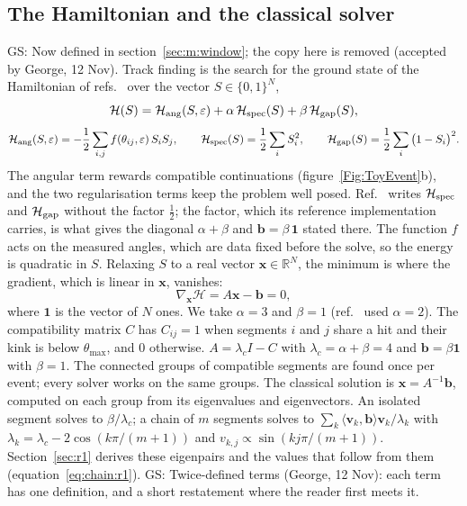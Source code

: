 \documentclass[11pt,a4paper]{article}
\newcommand{\gs}[1]{{\color{orange!85!black} GS: #1 }}
\newcommand{\gss}[1]{{\color{teal} #1}}
\newcommand{\R}{\mathbb{R}}
\begin{document}
\subsection{The Hamiltonian and the classical solver}\label{sec:m:hamiltonian}
\gs{Now defined in section~\mbox{\ref{sec:m:window}}; the copy here is removed (accepted by George, 12 Nov).} 
\gss{Track finding is the search for the ground state of the Hamiltonian of refs.~\cite{nicotra2023,trackhhl} over the vector $S\in\{0,1\}^N$,
\begin{equation}
\mathcal{H}(S)=\mathcal{H}_{\rm ang}(S,\varepsilon)+\alpha\,\mathcal{H}_{\rm spec}(S)+\beta\,\mathcal{H}_{\rm gap}(S),
\end{equation}
\begin{equation}
\mathcal{H}_{\rm ang}(S,\varepsilon)=-\frac12\sum_{i,j}f(\theta_{ij},\varepsilon)\,S_iS_j,\qquad
\mathcal{H}_{\rm spec}(S)=\frac12\sum_i S_i^2,\qquad
\mathcal{H}_{\rm gap}(S)=\frac12\sum_i\big(1-S_i\big)^2 .
\end{equation}
The angular term rewards compatible continuations (figure~\ref{Fig:ToyEvent}b), and the two regularisation terms keep the problem well posed. Ref.~\cite{trackhhl} writes $\mathcal{H}_{\rm spec}$ and $\mathcal{H}_{\rm gap}$ without the factor $\frac12$; the factor, which its reference implementation carries, is what gives the diagonal $\alpha+\beta$ and $\mathbf{b}=\beta\,\mathbf{1}$ stated there. The function $f$ acts on the measured angles, which are data fixed before the solve, so the energy is quadratic in $S$. Relaxing $S$ to a real vector $\mathbf{x}\in\R^N$, the minimum is where the gradient, which is linear in $\mathbf{x}$, vanishes:
\begin{equation}
\label{eq:Axb:methods}
\nabla_{\mathbf{x}}\mathcal{H}=A\mathbf{x}-\mathbf{b}=0,
\end{equation}
where $\mathbf{1}$ is the vector of $N$ ones. We take $\alpha=3$ and $\beta=1$ (ref.~\cite{trackhhl} used $\alpha=2$).}
The
compatibility matrix $C$ has $C_{ij}=1$ when segments $i$ and $j$ share a hit and their kink is
below $\theta_{\max}$, and $0$ otherwise. $A=\lambda_cI-C$ with $\lambda_c=\alpha+\beta=4$ and
$\mathbf{b}=\beta\mathbf{1}$ with $\beta=1$. The connected groups of compatible segments are found
once per event; every solver works on the same groups. The classical solution is
$\mathbf{x}=A^{-1}\mathbf{b}$, computed on each group from its eigenvalues and eigenvectors. An
isolated segment solves to $\beta/\lambda_c$; a chain of $m$ segments solves to
$\sum_k\langle\mathbf{v}_k,\mathbf{b}\rangle\mathbf{v}_k/\lambda_k$ with
$\lambda_k=\lambda_c-2\cos(k\pi/(m+1))$ and $v_{k,j}\propto\sin(kj\pi/(m+1))$. \gss{Section~\ref{sec:r1} derives these eigenpairs and the values that follow from them (equation~\eqref{eq:chain:r1}).} \gs{Twice-defined terms (George, 12 Nov): each term has one definition, and a short restatement where the reader first meets it.}
\end{document}
